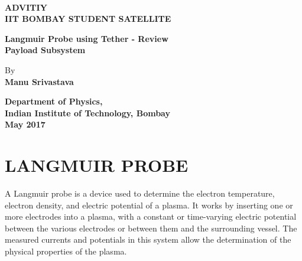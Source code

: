 \documentclass[12pt, a4paper, oneside]{book}
\begin{document}
	
	\thispagestyle{empty}
	
	{%
		\sffamily
		\centering
		\Large
		
		~\vspace{\fill}
		
		{\huge 
			\bfseries{ADVITIY\\ \bigskip IIT BOMBAY STUDENT SATELLITE}
		}
		
		\vspace{2cm}
		
		{\LARGE
			\bfseries{Langmuir Probe using Tether - Review\\ \bigskip Payload Subsystem}
		}
		
		\vspace{2cm}
		
		By \\ \bigskip \bfseries{Manu Srivastava}
		
		\vspace{1.5cm}
		
		
		
		\vspace{2.5cm}
		\bfseries{Department of Physics, \\ \bigskip Indian Institute of Technology, Bombay\\ \bigskip
			May 2017}
		
	}%
	
	

	
	\chapter{LANGMUIR PROBE}
	A Langmuir probe is a device used to determine the electron temperature, electron density, and electric potential of a plasma. It works by inserting one or more electrodes into a plasma, with a constant or time-varying electric potential between the various electrodes or between them and the surrounding vessel. The measured currents and potentials in this system allow the determination of the physical properties of the plasma.
\end{document}
